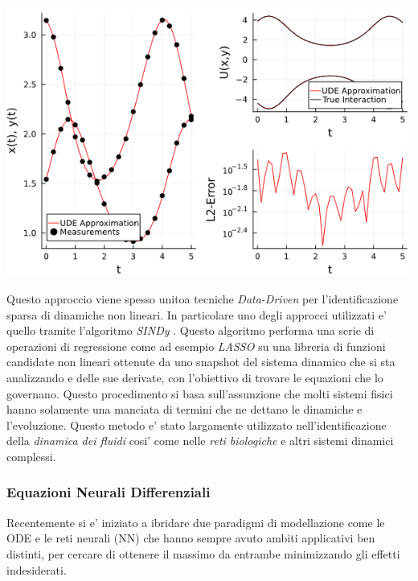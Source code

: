 \begin{minipage}{\linewidth}
    \centering
    \includegraphics[scale=0.7]{img/ude_approx.png}
    \label{fig:UDE_approx}
\end{minipage}

Questo approccio viene spesso unitoa tecniche \emph{Data-Driven} \cite{datadrivendiffeq} per l'identificazione
sparsa di dinamiche non lineari. In particolare uno degli approcci utilizzati 
e' quello tramite l'algoritmo \emph{SINDy} \cite{wiki:Sparse_identification_of_non-linear_dynamics}. 
Questo algoritmo performa una serie di operazioni di regressione come 
ad esempio \emph{LASSO} su una libreria di funzioni candidate non lineari ottenute
da uno snapshot del sistema dinamico che si sta analizzando e delle sue derivate, 
con l'obiettivo di trovare le equazioni che lo governano. Questo procedimento 
si basa sull'assunzione che molti sistemi fisici hanno solamente una manciata di 
termini che ne dettano le dinamiche e l'evoluzione. Questo metodo e' stato largamente
utilizzato nell'identificazione della \emph{dinamica dei fluidi} cosi' come
nelle \emph{reti biologiche} e altri sistemi dinamici complessi.

\subsubsection*{Equazioni Neurali Differenziali}
Recentemente si e' iniziato a ibridare due paradigmi di modellazione come
le ODE e le reti neurali (NN) che hanno sempre avuto ambiti applicativi 
ben distinti, per cercare di ottenere il massimo da entrambe minimizzando 
gli effetti indesiderati. \cite{Kim_2021} \cite{chen2019neural}

